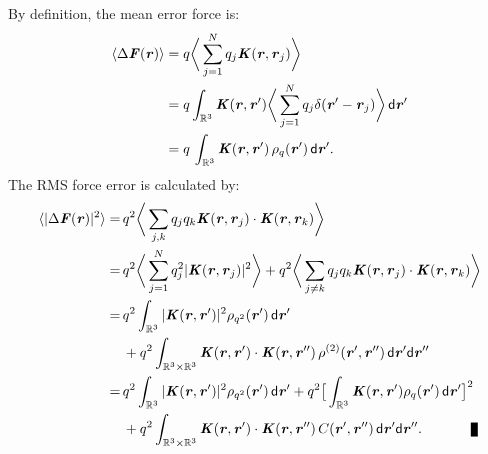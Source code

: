 \documentclass[journal=jacsat,manuscript=article]{achemso}
\renewcommand{\v}[1]{\textbf{\textit{#1}}}
\renewcommand{\d}[1]{\textsf{#1}}
\newenvironment{proof}[1][Proof]{\begin{trivlist}
\item[\hskip \labelsep {\bfseries #1}]}{\end{trivlist}}
\newcommand{\qed}{\nobreak \ifvmode \relax \else
      \ifdim\lastskip<1.5em \hskip-\lastskip
      \hskip1.5em plus0em minus0.5em \fi \nobreak
      \vrule height0.75em width0.5em depth0.25em\fi}
\begin{document}
\begin{proof}
  By definition, the mean error force is:
  \begin{align*}
    \langle\Delta\v F(\v r)\rangle
    &=
    q\bigg\langle \sum_{j=1}^Nq_j\v K(\v r,\v r_j)\bigg\rangle\\
    &=
    q\int_{\mathbb R^3}\v K(\v r, \v r')
    \bigg\langle \sum_{j=1}^Nq_j\delta (\v r' -\v r_j)\bigg\rangle
    \,\d d\v r'\\
    &= 
    q\,\int_{\mathbb R^3}\v K(\v r,\v r')\,\rho_q(\v r')\,\d d\v r'.
  \end{align*}
  The RMS force error is calculated by:
  \begin{align} \nonumber
    \langle\vert\Delta\v F(\v r)\vert^2\rangle
    =\,&
    q^2\bigg\langle\sum_{j,k}
    q_jq_k\v K(\v r, \v r_j)\cdot\v K(\v r, \v r_k)\bigg\rangle \\ \nonumber
    =\,&
    q^2\bigg\langle\sum_{j=1}^N
    q_j^2\vert\v K(\v r, \v r_j)\vert^2
    \bigg\rangle +
    q^2\bigg\langle\sum_{j\neq k}
    q_jq_k \v K(\v r, \v r_j)\cdot\v K(\v r, \v r_k)
    \bigg\rangle \\ \nonumber
    =\,&
    q^2\int_{\mathbb R^3}
    \vert\v K(\v r, \v r')\vert^2\rho_{q^2}(\v r')\,\d d\v r'
    \\\label{eqn:prf-error-step3}
    & +
    q^2\int_{\mathbb R^3\times\mathbb R^3}
    \v K(\v r , \v r')\cdot\v K(\v r , \v r'')\,
    \rho^{(2)}(\v r', \v r'')
    \,\d d\v r'\d d\v r''\\\nonumber
    =\,&
    q^2\int_{\mathbb R^3}
    \vert\v K(\v r , \v r')\vert^2\rho_{q^2}(\v r')\,\d d\v r'
    +
    q^2
    \big[
    \int_{\mathbb R^3}
    \v K(\v r , \v r')\rho_{q}(\v r')\,\d d\v r'
    \big]^2
    \\ \nonumber
    & +
    q^2\int_{\mathbb R^3\times\mathbb R^3}
    \v K(\v r , \v r')\cdot\v K(\v r , \v r'')\,
    C(\v r', \v r'')
    \,\d d\v r'\d d\v r''.\qquad\qed
  \end{align}
\end{proof}
\end{document}
